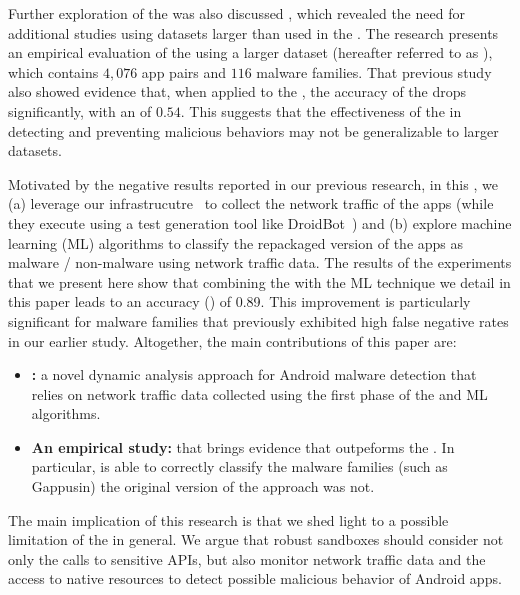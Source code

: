 Further exploration of the \mas was also discussed \pw, which revealed the need for additional studies using datasets larger than used in the \blls. The research presents an empirical evaluation of the \mas using a larger dataset (hereafter referred to as \cds), which contains $4,076$ app pairs and $116$ malware families. That previous study also showed evidence that, when applied to the \cds, the accuracy of the \mas drops significantly, with an \fone of $0.54$. This suggests that the effectiveness of the \mas in detecting and preventing malicious behaviors may not be generalizable to larger datasets. 

Motivated by the negative results reported in our previous research, in this \chap, we (a) leverage our
\droidxp infrastrucutre~\cite{DBLP:conf/scam/CostaMCMVBC20} to collect the network traffic of the apps (while they execute using a
test generation tool like DroidBot~\cite{DBLP:conf/icse/LiYGC17}) and (b) explore machine learning (ML) algorithms to classify
the repackaged version of the apps as malware / non-malware using network traffic data. The results
of the experiments that we present here show that combining the \mas with the ML technique we
detail in this paper leads to an accuracy (\fone) of 0.89. This improvement is particularly significant for malware
families that previously exhibited high false negative rates in our earlier study. Altogether, the main
contributions of this paper are:

\begin{itemize}
  \item {\bf \droidxpflow:} a novel dynamic analysis approach for Android malware detection that relies on network traffic data
  collected using the first phase of the \mas and ML algorithms.

  \item {\bf An empirical study:} that brings evidence that \droidxpflow outpeforms the \mas. In particular, \droidxpflow
  is able to correctly classify the malware families (such as Gappusin) the original version of the
  \mas approach was not. 
\end{itemize}

The main implication of this research is that we shed light to
a possible limitation of the \mas in general. We argue that
robust sandboxes should consider not only the calls to
sensitive APIs, but also monitor network traffic data and the
access to native resources to detect possible malicious
behavior of Android apps.

